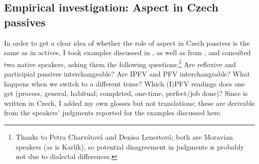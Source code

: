 \documentclass[output=paper,colorlinks,citecolor=brown]{langscibook}
\begin{document}
\subsection{Empirical investigation: Aspect in Czech passives}
\label{emp}

In order to get a clear idea of whether the role of aspect in Czech passives is the same as in actives, I took examples discussed in \citet{karlik17}, as well as  from \citet{cahamedova20}, and consulted two native speakers, asking them the following questions:\footnote{Thanks to Petra Charvátová and Denisa Lenertová; both are Moravian speakers (as is Karlík), so potential disagreement in judgments is probably not due to dialectal differences.}
Are reflexive and participial passives interchangeable? Are IPFV and PFV interchangeable? What happens when we switch to a different tense? Which (I)PFV readings does one get (process, general, habitual; completed, one-time, perfect/job done)? Since \citet{karlik17} is written in Czech, I added my own glosses but not translations; these are derivable from the speakers' judgments reported for the examples discussed here. 
\end{document}
